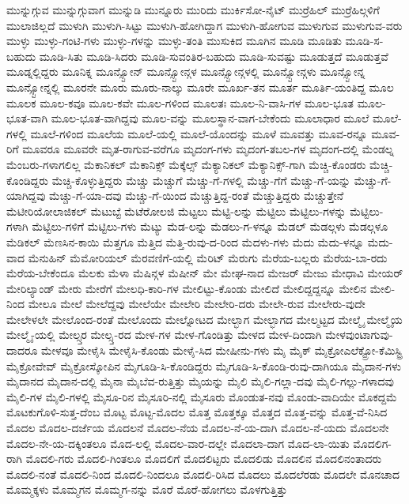 {ಮುನ್ನುಗ್ಗುವ
ಮುನ್ನುಗ್ಗುವಾಗ
ಮುನ್ನುಡಿ
ಮುನ್ನೂರು
ಮುರಿದು
ಮುರ್ಕಿಸೋ-ನೈಟ್
ಮುರ್ರೆಹಿಲ್
ಮುರ್ರೆಹಿಲ್ಗಳಿಗೆ
ಮುಲಾಜಿಲ್ಲದೆ
ಮುಳುಗಿ
ಮುಳುಗಿ-ಸಿಟ್ಟು
ಮುಳುಗಿ-ಹೋಗಿದ್ದಾಗ
ಮುಳುಗಿ-ಹೋಗುವ
ಮುಳುಗುವ
ಮುಳುಗುವ-ವರು
ಮುಳ್ಳು
ಮುಳ್ಳು-ಗಂಟಿ-ಗಳು
ಮುಳ್ಳು-ಗಳನ್ನು
ಮುಳ್ಳು-ತಂತಿ
ಮುಸುಕಿದ
ಮೂಗಿನ
ಮೂಡಿ
ಮೂಡಿತು
ಮೂಡಿ-ಸ-ಬಹುದು
ಮೂಡಿ-ಸಿತು
ಮೂಡಿ-ಸಿದರು
ಮೂಡಿ-ಸುವಂತಿರ-ಬಹುದು
ಮೂಡಿ-ಸುವಷ್ಟು
ಮೂಡುತ್ತದೆ
ಮೂಡುತ್ತವೆ
ಮೂಡ್ನಲ್ಲಿದ್ದರು
ಮೂನಿಕ್ನ
ಮೂನ್ಸ್ಟೋನ್
ಮೂನ್ಸ್ಟೋನ್ಗಳ
ಮೂನ್ಸ್ಟೋನ್ಗಳಲ್ಲಿ
ಮೂನ್ಸ್ಟೋನ್ಗಳು
ಮೂನ್ಸ್ಟೋನ್ನ
ಮೂನ್ಸ್ಟೋನ್ನಲ್ಲಿ
ಮೂರನೇ
ಮೂರು
ಮೂರು-ನಾಲ್ಕು
ಮೂರೇ
ಮೂರ್ಖ-ತನ
ಮೂರ್ತ
ಮೂರ್ತಿ-ಯಂತಿದ್ದ
ಮೂಲ
ಮೂಲಕ
ಮೂಲ-ಕವೂ
ಮೂಲ-ಕವೇ
ಮೂಲ-ಗಳಿಂದ
ಮೂಲತಃ
ಮೂಲ-ನಿ-ವಾಸಿ-ಗಳ
ಮೂಲ-ಭೂತ
ಮೂಲ-ಭೂತ-ವಾಗಿ
ಮೂಲ-ಭೂತ-ವಾಗಿದ್ದವು
ಮೂಲ-ವನ್ನು
ಮೂಲಸ್ಥಾನ-ವಾಗ-ಬೇಕೆಂದು
ಮೂಲಾಧಾರ
ಮೂಲೆ
ಮೂಲೆ-ಗಳಲ್ಲಿ
ಮೂಲೆ-ಗಳಿಂದ
ಮೂಲೆಯ
ಮೂಲೆ-ಯಲ್ಲಿ
ಮೂಲೆ-ಯೊಂದನ್ನು
ಮೂಳೆ
ಮೂವತ್ತು
ಮೂವ-ರನ್ನೂ
ಮೂವ-ರಿಗೆ
ಮೂವರೂ
ಮೂವರೇ
ಮೃತ-ರಾಗುವ-ವರೆಗೂ
ಮೃದಂಗ-ಗಳು
ಮೃದಂಗ-ತಬಲ-ಗಳ
ಮೃದಂಗ-ದಲ್ಲಿ
ಮೆಂಡಲ್ನ
ಮೆಂಬರು-ಗಳಾಗಲಿಲ್ಲ
ಮೆಕಾನಿಕಲ್
ಮೆಕಾನಿಕ್ಸ್
ಮೆಕ್ಕೆಲ್ಸ್
ಮೆಕ್ಯಾನಿಕಲ್
ಮೆಕ್ಯಾನಿಕ್ಸ್-ಗಾಗಿ
ಮೆಚ್ಚಿ-ಕೊಂಡರು
ಮೆಚ್ಚಿ-ಕೊಂಡಿದ್ದರು
ಮೆಚ್ಚಿ-ಕೊಳ್ಳುತ್ತಿದ್ದರು
ಮೆಚ್ಚು
ಮೆಚ್ಚುಗೆ
ಮೆಚ್ಚು-ಗೆ-ಗಳಲ್ಲಿ
ಮೆಚ್ಚು-ಗೆಗೆ
ಮೆಚ್ಚು-ಗೆ-ಯನ್ನು
ಮೆಚ್ಚು-ಗೆ-ಯಾಗಿದ್ದವು
ಮೆಚ್ಚು-ಗೆ-ಯಾ-ದವು
ಮೆಚ್ಚು-ಗೆ-ಯಿಂದ
ಮೆಚ್ಚುತ್ತಿದ್ದ-ರಂತೆ
ಮೆಚ್ಚುತ್ತಿದ್ದರು
ಮೆಚ್ಚುತ್ತೇನೆ
ಮೆಟೀರಿಯೋಲಾಜಿಕಲ್
ಮೆಟುಬ್ಟೆ
ಮೆಟೆರೋಲಜಿ
ಮೆಟ್ಟಲು
ಮೆಟ್ಟಿ-ಲನ್ನು
ಮೆಟ್ಟಿಲು
ಮೆಟ್ಟಿಲು-ಗಳನ್ನು
ಮೆಟ್ಟಿಲು-ಗಳಾಗಿ
ಮೆಟ್ಟಿಲು-ಗಳಿಗೆ
ಮೆಟ್ಟಿಲು-ಗಳು
ಮೆಟ್ಯು
ಮೆಡ-ಲನ್ನು
ಮೆಡಲು-ಗ-ಳನ್ನೂ
ಮೆಡಲ್
ಮೆಡಲ್ಗಳು
ಮೆಡಲ್ಗಳೂ
ಮೆಡಿಕಲ್
ಮೆಣಸಿನ-ಕಾಯಿ
ಮೆತ್ತಗೂ
ಮೆತ್ತಿದ
ಮೆತ್ತಿ-ರುವು-ದ-ರಿಂದ
ಮೆದಳು-ಗಳು
ಮೆದು
ಮೆದು-ಳನ್ನೂ
ಮೆದು-ವಾದ
ಮೆನುಹಿನ್
ಮೆಮೋರಿಯಲ್
ಮೆರವಣಿಗೆ-ಯಲ್ಲಿ
ಮೆರಿಟ್
ಮೆರುಗು
ಮೆರೆಯ-ಬಲ್ಲರು
ಮೆರೆಯ-ಬಾ-ರದು
ಮೆರೆಯ-ಬೇಕೆಂದೂ
ಮೆಲಕು
ಮೆಳಾ
ಮೆಷಿನ್ಗಳ
ಮೆಷೀನ್
ಮೇ
ಮೇಘ-ನಾದ
ಮೇಜರ್
ಮೇಜು
ಮೇಧಾವಿ
ಮೇಯರ್
ಮೇರಿಲ್ಯಾಂಡ್
ಮೇರು
ಮೇರೆಗೆ
ಮೇಲಧಿ-ಕಾರಿ-ಗಳ
ಮೇಲಿಟ್ಟು-ಕೊಂಡು
ಮೇಲಿದೆ
ಮೇಲಿದ್ದದ್ದನ್ನೂ
ಮೇಲಿನ
ಮೇಲಿ-ನಿಂದ
ಮೇಲೂ
ಮೇಲೆ
ಮೇಲೆದ್ದವು
ಮೇಲೆಯೇ
ಮೇಲೇರಿ
ಮೇಲೇರಿ-ದರು
ಮೇಲೇ-ರುವ
ಮೇಲೇರು-ವುದೇ
ಮೇಲೇಳಲೇ
ಮೇಲೊಂದ-ರಂತೆ
ಮೇಲೊಂದು
ಮೇಲ್ನೋಟದ
ಮೇಲ್ಭಾಗ
ಮೇಲ್ಭಾಗದ
ಮೇಲ್ಮಟ್ಟದ
ಮೇಲ್ಮೈ
ಮೇಲ್ಮೈಯ
ಮೇಲ್ಮೈ-ಯಲ್ಲಿ
ಮೇಲ್ಸ್ತರ
ಮೇಲ್ಸ್ತ-ರದ
ಮೇಳ-ಗಳ
ಮೇಳ-ಗೊಂಡಿತ್ತು
ಮೇಳದ
ಮೇಳ-ದಿಂದಾಗಿ
ಮೇಳವುಂಟಾಗುವು-ದಾದರೂ
ಮೇಳವೂ
ಮೇಳೈಸಿ
ಮೇಳೈಸಿ-ಕೊಂಡು
ಮೇಳೈ-ಸಿದ
ಮೇಷೀನು-ಗಳು
ಮೈ
ಮೈಕ್
ಮೈಕ್ರೋಎಲೆಕ್ಟ್ರೋ-ಕೆಮಿಸ್ಟ್ರಿ
ಮೈಕ್ರೋವೇವ್
ಮೈಕ್ರೋಸ್ಕೋಪಿನ
ಮೈಗೂಡಿ-ಸಿ-ಕೊಂಡಿದ್ದರು
ಮೈಗೂಡಿ-ಸಿ-ಕೊಂಡಿ-ರುವು-ದಾಗಿಯೂ
ಮೈದಾನ-ಗಳು
ಮೈದಾನದ
ಮೈದಾನ-ದಲ್ಲಿ
ಮೈನಾ
ಮೈಬೆವ-ರುತ್ತಿತ್ತು
ಮೈಯನ್ನು
ಮೈಲಿ
ಮೈಲಿ-ಗಲ್ಲಾ-ದವು
ಮೈಲಿ-ಗಲ್ಲು-ಗಳಾದವು
ಮೈಲಿ-ಗಳ
ಮೈಲಿ-ಗಳಲ್ಲಿ
ಮೈಸೂ-ರಿನ
ಮೈಸೂರಿ-ನಲ್ಲಿ
ಮೈಸೂರು
ಮೊಂಡುತ-ನವು
ಮೊಂಡು-ವಾದಿಯೇ
ಮೊಕದ್ದಮೆ
ಮೊಟಕುಗೊಳಿ-ಸುತ್ತ-ದೆಂಬ
ಮೊಟ್ಟ
ಮೊಟ್ಟ-ಮೊದಲ
ಮೊತ್ತ
ಮೊತ್ತಕ್ಕೂ
ಮೊತ್ತದ
ಮೊತ್ತ-ವನ್ನು
ಮೊತ್ತ-ವೆ-ನಿಸಿದ
ಮೊದಲ
ಮೊದಲ-ದರ್ಜೆಯ
ಮೊದಲನೆ
ಮೊದಲ-ನೆಯ
ಮೊದಲ-ನೆ-ಯ-ದಾಗಿ
ಮೊದಲ-ನೆ-ಯದು
ಮೊದಲನೇ
ಮೊದಲ-ನೇ-ಯ-ದಕ್ಕಿಂತಲೂ
ಮೊದ-ಲಲ್ಲಿ
ಮೊದಲ-ವಾರ-ದಲ್ಲೇ
ಮೊದಲಾ-ದಾಗ
ಮೊದ-ಲಾ-ಯಿತು
ಮೊದಲಿಗ-ರಾಗಿ
ಮೊದಲಿ-ಗರು
ಮೊದಲಿ-ಗಿಂತಲೂ
ಮೊದಲಿಗೆ
ಮೊದಲಿಟ್ಟರು
ಮೊದಲಿಡು
ಮೊದಲಿನ
ಮೊದಲಿನಂತಾದರು
ಮೊದಲಿ-ನಂತೆ
ಮೊದಲಿ-ನಿಂದ
ಮೊದಲಿ-ನಿಂದಲೂ
ಮೊದಲಿ-ರಿಸಿದ
ಮೊದಲು
ಮೊದಲೆರಡು
ಮೊದಲೇ
ಮೊನಚಾದ
ಮೊಮ್ಮಕ್ಕಳು
ಮೊಮ್ಮಗನ
ಮೊಮ್ಮಗ-ನನ್ನು
ಮೊರೆ
ಮೊರೆ-ಹೋಗಲು
ಮೊಳಗುತ್ತಿತ್ತು
}
